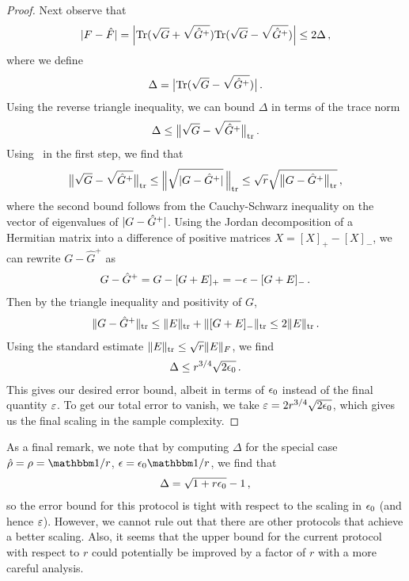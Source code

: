 \begin{proof}
Next observe that
\begin{align*}
	\lvert F-\hat F\rvert = \Bigl\lvert \mathrm{Tr}(\sqrt{G} + \sqrt{\hat{G}^+}) \mathrm{Tr}(\sqrt{G} - \sqrt{\hat{G}^+}) \Bigr\rvert \le 2 \Delta \,,
\end{align*}
where we define 
\begin{align}
	\Delta = \bigl\lvert\mathrm{Tr}(\sqrt{G} - \sqrt{\hat{G}^+})\bigr\rvert \,.
\end{align}
Using the reverse triangle inequality, we can bound $\Delta$ in terms of the trace norm
\begin{align}
	\Delta \le \bigl\lVert\sqrt{G} - \sqrt{\hat{G}^+}\bigr\rVert_{\mathrm{tr}} \,.
\end{align}
Using~\cite[Thm. X.1.3]{Bhatia1996} in the first step, we find that
\begin{align*}
	\bigl\lVert\sqrt{G} - \sqrt{\hat{G}^+}\bigr\rVert_{\mathrm{tr}} \le 
	\Bigl\lVert\sqrt{\lvert G -\hat{G}^+\rvert}\,\Bigr\rVert_{\mathrm{tr}} \le 
	\sqrt{r}\sqrt{\bigl\lVert G -\hat{G}^+\bigr\rVert_{\mathrm{tr}}}\,,
\end{align*}
where the second bound follows from the Cauchy-Schwarz inequality on the vector of eigenvalues of $\lvert G -\hat{G}^+\rvert$. Using the Jordan decomposition of a Hermitian matrix into a difference of positive matrices $X = [X]_+ - [X]_-$, we can rewrite $G-\hat{G}^+$ as
\begin{align}
	G-\hat{G}^+ = G-[G+E]_+ = -\epsilon - [G+E]_- \,.
\end{align}
Then by the triangle inequality and positivity of $G$, 
\begin{align}
	\lVert G-\hat{G}^+\rVert_{\mathrm{tr}} \le \lVert E\rVert_{\mathrm{tr}} + \lVert[G+E]_-\rVert_{\mathrm{tr}} \le 2 \lVert E\rVert_{\mathrm{tr}}\,.
\end{align}
Using the standard estimate $\lVert E\rVert_{\mathrm{tr}} \le \sqrt{r}\lVert E\rVert_F$, we find
\begin{align}
	\Delta \le r^{3/4} \sqrt{2 \epsilon_0} \,.
\end{align}
This gives our desired error bound, albeit in terms of $\epsilon_0$ instead of the final quantity $\varepsilon$. To get our total error to vanish, we take $\varepsilon = 2 r^{3/4} \sqrt{2 \epsilon_0}$, which gives us the final scaling in the sample complexity.
\end{proof}

As a final remark, we note that by computing $\Delta$ for the special case $\hat\rho = \rho = \one/r$, $\eps = \eps_0 \one/r$, we find that 
\begin{align}
	\Delta = \sqrt{1+r \epsilon_0}-1 \,,
\end{align}
so the error bound for this protocol is tight with respect to the scaling in $\epsilon_0$ (and hence $\varepsilon$). However, we cannot rule out that there are other protocols that achieve a better scaling. Also, it seems that the upper bound for the current protocol with respect to $r$ could potentially be improved by a factor of $r$ with a more careful analysis.

